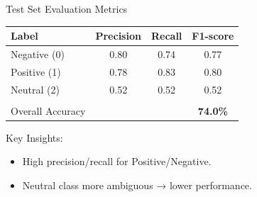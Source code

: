 \documentclass[aspectratio=169]{beamer}
\begin{document}
\begin{frame}{Test Set Evaluation Metrics}
  \vspace{-0.5em}
  {\small
    \begin{tabular}{lccc}
      Label            & Precision & Recall & F1-score     \\
      \hline
      Negative (0)     & 0.80      & 0.74   & 0.77         \\
      Positive (1)     & 0.78      & 0.83   & 0.80         \\
      Neutral (2)      & 0.52      & 0.52   & 0.52         \\
      \\[-0.8em]
      Overall Accuracy &           &        & {\bf 74.0\%} \\
    \end{tabular}}

  \vspace{1em}

  Key Insights:
  \begin{itemize}
    \item High precision/recall for Positive/Negative.
    \item Neutral class more ambiguous → lower performance.
  \end{itemize}
\end{frame}
\end{document}
